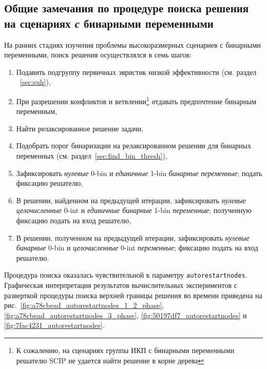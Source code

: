 \documentclass[%
	11pt,
	a4paper,
	utf8,
		]{article}
\begin{document}
\subsection{Общие замечания по процедуре поиска решения на сценариях \emph{с} бинарными переменными}

На ранних стадиях изучения проблемы высокоразмерных сценариев с бинарными переменными, поиск решения осуществлялся в семь шагов:
\begin{enumerate}
	\item  Подавить подгруппу первичных эвристик низкой эффективности (см. раздел ~\ref{sec:suh}),
	
	\item При разрешении конфликтов и ветвлении\footnote{К сожалению, на сценариях группы ИКП с бинарными переменными решателю SCIP не удается найти решение в корне дерева} отдавать предпочтение бинарным переменным,
	
	\item Найти релаксированное решение задачи,
	
	\item Подобрать порог бинаризации на релаксированном решении для бинарных переменных (см. раздел~\ref{sec:find_bin_thresh}),
	
	\item Зафиксировать \emph{нулевые} 0-bin и \emph{единичные} 1-bin \emph{бинарные переменные}; подать фиксацию решателю,
	
	\item В решении, найденном на предыдущей итерации, зафиксировать \emph{нулевые целочисленные} 0-int и \emph{единичные бинарные} 1-bin \emph{переменные}; полученную фиксацию подать на вход решателю,
	
	\item В решении, полученном на предыдущей итерации, зафиксировать \emph{нулевые бинарные} 0-bin и \emph{целочисленные} 0-int  \emph{переменные}; фиксацию подать на вход решателю.
\end{enumerate}

Процедура поиска оказалась чувствительной к параметру \texttt{autorestartnodes}. Графическая интерпретация результатов вычислительных экспериментов с разверткой процедуры поиска верхней границы решения во времени приведена на рис.~\ref{fig:a78cbead_autorestartnodes_1_2_phase}, \ref{fig:a78cbead_autorestartnodes_3_phase}, \ref{fig:50197df7_autorestartnodes} и \ref{fig:7fac4231_autorestartnodes}.
\end{document}
